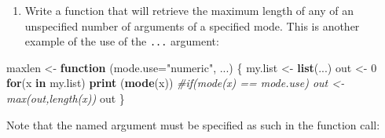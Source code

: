 \documentclass[
]{book}
\newenvironment{Shaded}{\begin{snugshade}}{\end{snugshade}}
\newcommand{\AttributeTok}[1]{\textcolor[rgb]{0.13,0.29,0.53}{#1}}
\newcommand{\CommentTok}[1]{\textcolor[rgb]{0.56,0.35,0.01}{\textit{#1}}}
\newcommand{\ControlFlowTok}[1]{\textcolor[rgb]{0.13,0.29,0.53}{\textbf{#1}}}
\newcommand{\DecValTok}[1]{\textcolor[rgb]{0.00,0.00,0.81}{#1}}
\newcommand{\FunctionTok}[1]{\textcolor[rgb]{0.13,0.29,0.53}{\textbf{#1}}}
\newcommand{\NormalTok}[1]{#1}
\newcommand{\OtherTok}[1]{\textcolor[rgb]{0.56,0.35,0.01}{#1}}
\newcommand{\StringTok}[1]{\textcolor[rgb]{0.31,0.60,0.02}{#1}}
\providecommand{\tightlist}{%
  \setlength{\itemsep}{0pt}\setlength{\parskip}{0pt}}
\begin{document}
\begin{enumerate}
\def\labelenumi{(\alph{enumi})}
\setcounter{enumi}{1}
\tightlist
\item
  Write a function that will retrieve the maximum length of any of an unspecified number of arguments of a specified mode. This is another example of the use of the \texttt{...} argument:
\end{enumerate}

\begin{Shaded}
\begin{Highlighting}[]
\NormalTok{maxlen }\OtherTok{\textless{}{-}} \ControlFlowTok{function}\NormalTok{ (}\AttributeTok{mode.use=}\StringTok{"numeric"}\NormalTok{, ...) }
\NormalTok{  \{ my.list }\OtherTok{\textless{}{-}} \FunctionTok{list}\NormalTok{(...)}
\NormalTok{    out }\OtherTok{\textless{}{-}} \DecValTok{0}
    \ControlFlowTok{for}\NormalTok{(x }\ControlFlowTok{in}\NormalTok{ my.list) }
      \FunctionTok{print}\NormalTok{ (}\FunctionTok{mode}\NormalTok{(x)) }\CommentTok{\#if(mode(x) == mode.use) out \textless{}{-} max(out,length(x))}
\NormalTok{    out}
\NormalTok{  \}}
\end{Highlighting}
\end{Shaded}

Note that the named argument must be specified as such in the function call:
\end{document}
